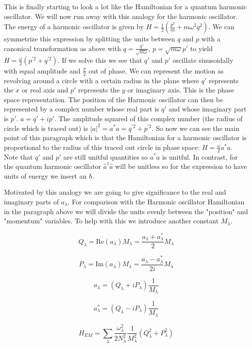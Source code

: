 \documentclass[12pt]{article}
\begin{document}
This is finally starting to look a lot like the Hamiltonian for a quantum harmonic oscillator. 
We will now run away with this analogy for the harmonic oscillator. 
The energy of a harmonic oscillator is given by $H = \frac{1}{2} (\frac{p^2}{m} + m\omega^2 q^2)$. We can symmetrize this expression by splitting the units between $q$ and $p$ with a canonical transformation as above with $q=\frac{q'}{\sqrt{m\omega}}$, $p =\sqrt{m\omega} p'$ to yield $H=\frac{\omega}{2}(p^{'2}+q^{'2})$. If we solve this we see that $q'$ and $p'$ oscillate sinusoidally with equal amplitude and $\frac{\pi}{2}$ out of phase. We can represent the motion as revolving around a circle with a certain radius in the plane where $q'$ represents the $x$ or real axis and $p'$ represents the $y$ or imaginary axis. This is the phase space representation. The position of the Harmonic oscillator can then be represented by a complex number whose real part is $q'$ and whose imaginary part is $p'$. $a = q' + ip'$. The amplitude squared of this complex number (the radius of circle which is traced out) is $|a|^2 = a^* a = q^{'2} + p^{'2}$. So now we can see the main point of this paragraph which is that the Hamiltonian for a harmonic oscillator is proportional to the radius of this traced out circle in phase space: $H = \frac{\omega}{2} a^* a$. Note that $q'$ and $p'$ are still unitful quantities so $a^*a$ is unitful. In contrast, for the quantum harmonic oscillator $\hat{a}^{\dag}\hat{a}$ will be unitless so for the expression to have units of energy we insert an $\hbar$. 

Motivated by this analogy we are going to give significance to the real and imaginary parts of $a_{\lambda}$. For comparison with the Harmonic oscillator Hamiltonian in the paragraph above we will divide the units evenly between the "position" and "momentum" variables. To help with this we introduce another constant $M_{\lambda}$.

\[Q_{\lambda} = \text{Re}(a_{\lambda}) M_{\lambda} = \frac{a_{\lambda}+a_{\lambda}^*}{2} M_{\lambda} \]

\[P_{\lambda} = \text{Im}(a_{\lambda}) M_{\lambda} = \frac{a_{\lambda}-a_{\lambda}^*}{2i} M_{\lambda} \]

\[a_{\lambda} = (Q_{\lambda} + i P_{\lambda})\frac{1}{M_{\lambda}} \]

\[a_{\lambda}^* = (Q_{\lambda} - i P_{\lambda})\frac{1}{M_{\lambda}} \]

\[H_{EM} = \sum_{\lambda} \frac{\omega_{\lambda}^2}{2N_{\lambda}^2}\frac{1}{M_{\lambda}^2} (Q_{\lambda}^2 + P_{\lambda}^2)\]
\end{document}
